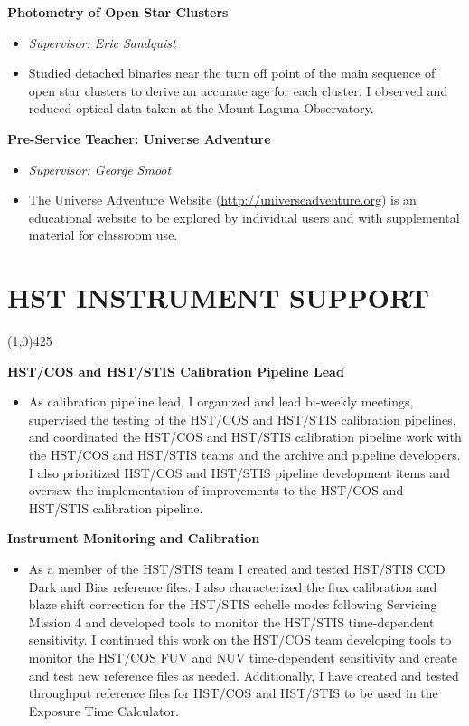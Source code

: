 \documentclass{res}
\begin{document}
\begin{resume}
   {\bf Photometry of Open Star Clusters }
      		\begin{itemize}
   		\item[] \emph{Supervisor: Eric Sandquist}
		\item[] Studied detached binaries near the turn off point of the main sequence of open star clusters to derive an accurate age for each cluster. I observed and reduced optical data taken at the Mount Laguna Observatory. 
   		\end{itemize}
   		
   {\bf Pre-Service Teacher: Universe Adventure}
   		\begin{itemize}
   		\item[] \emph{Supervisor: George Smoot}
		\item[] The Universe Adventure Website ({\color{blue}\url{http://universeadventure.org}}) is an educational website to be explored by individual users and with supplemental material for classroom use. 
		\end{itemize}

\section{HST INSTRUMENT SUPPORT} 
\vspace{-.2in}
\begin{center}
\line(1,0){425}
\end{center}
\vspace{-.3in}
\vspace{0.1in}

	{\bf HST/COS and HST/STIS Calibration Pipeline Lead}
		\begin{itemize}
		\item[]  As calibration pipeline lead, I organized and lead bi-weekly meetings, supervised the testing of the HST/COS and HST/STIS calibration pipelines, and coordinated the HST/COS and HST/STIS calibration pipeline work with the HST/COS and HST/STIS teams and the archive and pipeline developers. I also prioritized HST/COS and HST/STIS pipeline development items and oversaw the implementation of improvements to the HST/COS and HST/STIS calibration pipeline.
		\end{itemize}


   {\bf  Instrument Monitoring and Calibration}
        \begin{itemize}
        \item[]  As a member of the HST/STIS team I created and tested HST/STIS CCD Dark and Bias reference files. I also characterized the flux calibration and blaze shift correction for the HST/STIS echelle modes following Servicing Mission 4 and developed tools to monitor the HST/STIS time-dependent sensitivity. I continued this work on the HST/COS team developing tools to monitor the HST/COS FUV and NUV time-dependent sensitivity and create and test new reference files as needed. Additionally, I have created and tested throughput reference files for HST/COS and HST/STIS to be used in the Exposure Time Calculator.
		\end{itemize}
		

\end{resume}
\end{document}

